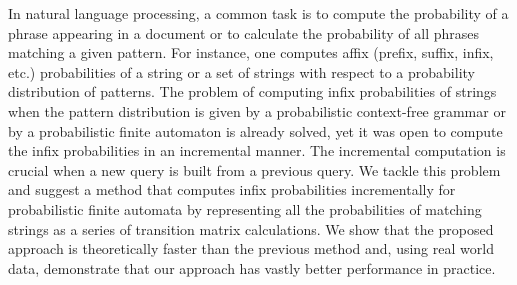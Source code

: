 In natural language processing, a common task is to compute the probability of a phrase appearing in a document or to calculate the probability of all phrases matching a given pattern. For instance, one computes affix (prefix, suffix, infix, etc.) probabilities of a string or a set of strings with respect to a probability distribution of patterns. The problem of computing infix probabilities of strings when the pattern distribution is given by a probabilistic context-free grammar or by a probabilistic finite automaton is already solved, yet it was open to compute the infix probabilities in an incremental manner. The incremental computation is crucial when a new query is built from a previous query. We tackle this problem and suggest a method that computes infix probabilities incrementally for probabilistic finite automata by representing all the probabilities of matching strings as a series of transition matrix calculations. We show that the proposed approach is theoretically faster than the previous method and, using real world data, demonstrate that our approach has vastly better performance in practice.

